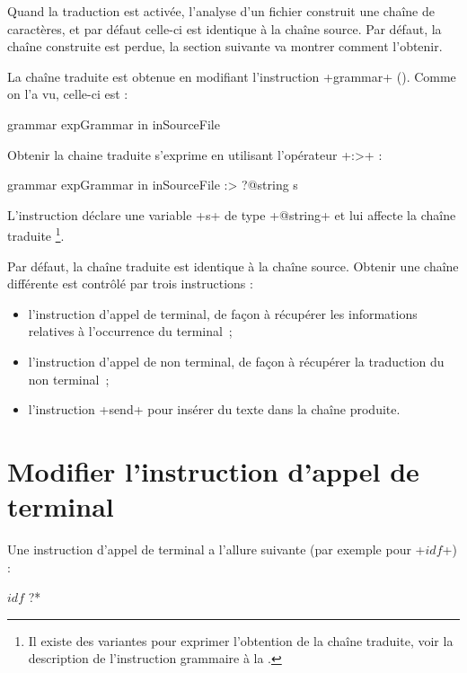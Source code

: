 Quand la traduction est activée, l'analyse d'un fichier construit une chaîne de caractères, et par défaut celle-ci est identique à la chaîne source. Par défaut, la chaîne construite est perdue, la section suivante va montrer comment l'obtenir.









La chaîne traduite est obtenue en modifiant l'instruction \ggs+grammar+ (). Comme on l'a vu, celle-ci est : 
\begin{galgas}
grammar expGrammar in inSourceFile
\end{galgas}

Obtenir la chaine traduite s'exprime en utilisant l'opérateur  \ggs+:>+ :
\begin{galgas}
grammar expGrammar in inSourceFile :> ?@string s
\end{galgas}

L'instruction déclare une variable \ggs+s+ de type \ggs+@string+ et lui affecte la chaîne traduite \footnote{Il existe des variantes pour exprimer l'obtention de la chaîne traduite, voir la description de l'instruction grammaire à la .}.

Par défaut, la chaîne traduite est identique à la chaîne source. Obtenir une chaîne différente est contrôlé par trois instructions :
\begin{itemize}
  \item l'instruction d'appel de terminal, de façon à récupérer les informations relatives à l'occurrence du terminal~;
  \item l'instruction d'appel de non terminal, de façon à récupérer la traduction du non terminal~;
  \item l'instruction \ggs+send+ pour insérer du texte dans la chaîne produite.
\end{itemize}







\section{Modifier l'instruction d'appel de terminal}

Une instruction d'appel de terminal a l'allure suivante (par exemple pour \ggs+$idf$+) :
\begin{galgas}
$idf$ ?*
\end{galgas}

